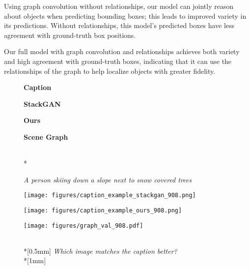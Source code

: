 \documentclass[10pt,twocolumn,letterpaper]{article}
\begin{document}
Using graph convolution without relationships, our model can jointly reason about
objects when predicting bounding boxes; this leads to improved variety in its
predictions. Without relationships, this model's predicted boxes have
less agreement with ground-truth box positions.

Our full model with graph convolution and relationships achieves both variety and 
high agreement with ground-truth boxes, indicating that it can use the
relationships of the graph to help localize objects with greater fidelity.

\begin{figure}
  \centering
  \begin{minipage}{0.09\textwidth}
    \centering
    \textbf{Caption}
  \end{minipage}
  \begin{minipage}{0.11\textwidth}
    \centering
    \textbf{StackGAN~\cite{zhang2017stackgan}}
  \end{minipage}
  \begin{minipage}{0.11\textwidth}
    \centering
    \textbf{Ours}
  \end{minipage}
  \begin{minipage}{0.115\textwidth}
    \centering
    \textbf{Scene Graph}
  \end{minipage} \\*
  \begin{minipage}[b]{0.09\textwidth}
    \centering
    \footnotesize
    \textit{A person skiing down a slope next to snow covered trees}
    \vspace{2mm}
  \end{minipage}
  \begin{minipage}[t]{0.11\textwidth}
    \texttt{[image: figures/caption\_example\_stackgan\_908.png]}
  \end{minipage}
  \begin{minipage}[t]{0.11\textwidth}
    \texttt{[image: figures/caption\_example\_ours\_908.png]}
  \end{minipage}
  \begin{minipage}[b]{0.115\textwidth}
    \centering
    \texttt{[image: figures/graph\_val\_908.pdf]}
  \end{minipage} \\*[0.5mm]
  {\footnotesize
    \hspace{-4mm} \emph{Which image matches the caption better?} \\*[1mm]
  }
  \hspace*{-14.5mm}\begin{tabular}{c|c|c}

\end{tabular}
\end{figure}
\end{document}
